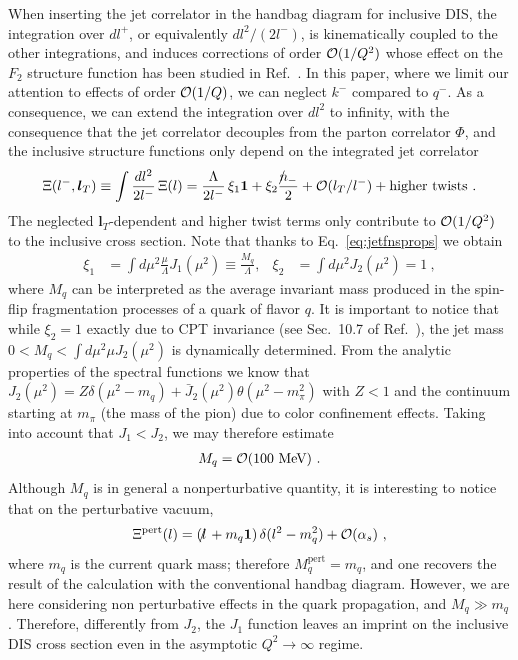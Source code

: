 \documentclass[preprintnumbers,floatfix,nofootinbib]{revtex4}
\newcommand{\lslash}{l \hspace{-0.19cm} / \,}
\newcommand{\nslash}{n \hspace{-0.24cm} / \,}
\newcommand{\mj}{M_q}
\newcommand{\mq}{m_q}
\newcommand{\id}{{\bm 1}
}
\begin{document}
When inserting the jet correlator in the handbag diagram for inclusive DIS, the integration over $dl^+$, or equivalently $dl^2/(2l^-)$, is kinematically coupled to the other integrations, and induces corrections of order ${\cal O}(1/Q^2)$ whose effect on the $F_2$ structure function has been studied in Ref.~\cite{Accardi:2008ne}. In this paper, where we limit our
attention to effects of order ${\cal O}(1/Q)$, we can neglect $k^-$ compared to $q^-$. As a consequence, we can extend the integration over $dl^2$ to infinity, with the consequence that the jet correlator decouples from the parton correlator $\Phi$, and the inclusive structure functions only depend on the integrated jet correlator 
\begin{equation} 
  \Xi(l^-,{\bm l_T}) \equiv \int \frac{dl^2}{2l^-} \, \Xi(l) 
    =  \frac{\Lambda}{2 l^-}\,\xi_1 \id
    +  \xi_2 \frac{\nslash_-}{2} 
    + {\cal O}(l_T/l^-) + \text{higher\ twists} \ .
\end{equation} 
The neglected ${\bm l_T}$-dependent and higher twist terms only contribute to ${\cal O}(1/Q^2)$ to the inclusive cross section. Note that thanks to Eq.~\eqref{eq:jetfnsprops} we obtain
\begin{align}
\xi_1 &= \int d\mu^2 \frac{\mu}{\Lambda} J_1(\mu^2) 
       \equiv \frac{\mj}{\Lambda},
&
\xi_2 &= \int d\mu^2 J_2(\mu^2) = 1 \ ,
\end{align} 
where $\mj$ can be interpreted as the average invariant mass produced in the spin-flip fragmentation processes of a quark of flavor $q$.
It is important to notice that while $\xi_2=1$ exactly due to CPT invariance
(see Sec.~10.7 of Ref.~\cite{Weinberg:1995mt}), the jet mass $0 < \mj < \int d\mu^2 \mu J_2(\mu^2)$ is dynamically determined. From the analytic properties of the spectral functions we know that $J_2(\mu^2) = Z \delta(\mu^2-m_q) + \bar J_2(\mu^2) \theta (\mu^2-m_\pi^2)$ with $Z<1$ and the continuum starting at $m_\pi$ (the mass of the pion) due to color confinement effects. Taking into account that $J_1 < J_2$, we may therefore estimate 
\begin{align}
  \label{eq:mjet}
  \mj = {\cal O}(100 \text{\ MeV}) \ .
\end{align}
Although $\mj$ is in general a nonperturbative quantity, it is interesting to
notice that on the perturbative vacuum, 
\begin{align*}
  \Xi^\text{pert}(l) = (\lslash + \mq \id) \, \delta(l^2-m_q^2) + {\cal O}(\alpha_s) \ ,
\end{align*}
where $\mq$ is the current quark mass; therefore $\mj^\text{pert}=m_q$, and one recovers the result of the calculation with the conventional handbag diagram.
However, we are here considering non perturbative effects
in the quark propagation, and $\mj \gg \mq$. 
Therefore, differently from $J_2$, the $J_1$ function leaves an imprint on the inclusive DIS cross section even in the asymptotic $Q^2 \to \infty$ regime. 
\end{document}
